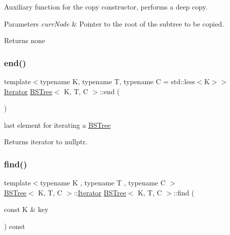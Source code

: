 Auxiliary function for the copy constructor, performs a deep copy. 


\begin{DoxyParams}{Parameters}
{\em curr\+Node} & Pointer to the root of the subtree to be copied. \\
\hline
\end{DoxyParams}
\begin{DoxyReturn}{Returns}
none 
\end{DoxyReturn}
\mbox{\label{class_b_s_tree_af08ce4b341b8503949ede9d4e6af8c8b}} 
\subsubsection{\texorpdfstring{end()}{end()}}
{\footnotesize\ttfamily template$<$typename K, typename T, typename C = std\+::less$<$\+K$>$$>$ \\
\hyperlink{class_b_s_tree_1_1_iterator}{Iterator} \hyperlink{class_b_s_tree}{B\+S\+Tree}$<$ K, T, C $>$\+::end (\begin{DoxyParamCaption}{ }\end{DoxyParamCaption})\hspace{0.3cm}{\ttfamily [inline]}}



last element for iterating a \hyperlink{class_b_s_tree}{B\+S\+Tree} 

\begin{DoxyReturn}{Returns}
iterator to nullptr. 
\end{DoxyReturn}
\mbox{\label{class_b_s_tree_a739cf62b2b972cd063928357dd2aba9a}} 
\subsubsection{\texorpdfstring{find()}{find()}}
{\footnotesize\ttfamily template$<$typename K , typename T , typename C $>$ \\
\hyperlink{class_b_s_tree}{B\+S\+Tree}$<$ K, T, C $>$\+::\hyperlink{class_b_s_tree_1_1_iterator}{Iterator} \hyperlink{class_b_s_tree}{B\+S\+Tree}$<$ K, T, C $>$\+::find (\begin{DoxyParamCaption}\item[{const K \&}]{key }\end{DoxyParamCaption}) const}




